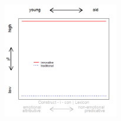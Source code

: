 \documentclass[12pt, table]{beamer}
\begin{document}
\begin{frame}
\begin{minipage}[t]{\linewidth}
\begin{minipage}{.45\linewidth}
\begin{tabular}{cccccccccc }
\end{tabular}
\end{minipage}
\hfill
\begin{minipage}{.45\linewidth}
\begin{figure}
\includegraphics[width=5cm]{images/LangChang22.png}
\end{figure}
\end{minipage}
\end{minipage}
\end{frame}
\end{document}
